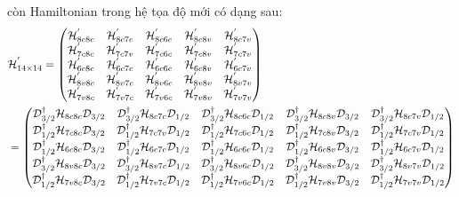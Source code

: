 còn Hamiltonian trong hệ tọa độ mới có dạng sau:
\begin{align}
&\mathcal{H}_{14\times14}^{'}=\begin{pmatrix}
\mathcal{H}_{8c8c}^{'} & \mathcal{H}_{8c7c}^{'} & \mathcal{H}_{8c6c}^{'} & \mathcal{H}_{8c8v}^{'} & \mathcal{H}_{8c7v}^{'}\\
\mathcal{H}_{7c8c}^{'} & \mathcal{H}_{7c7v}^{'} & \mathcal{H}_{7c6c}^{'} & \mathcal{H}_{7c8v}^{'} & \mathcal{H}_{7c7v}^{'}\\
\mathcal{H}_{6c8c}^{'} & \mathcal{H}_{6c7c}^{'} & \mathcal{H}_{6c6c}^{'} & \mathcal{H}_{6c8v}^{'} & \mathcal{H}_{6c7v}^{'}\\
\mathcal{H}_{8v8c}^{'} & \mathcal{H}_{8v7c}^{'} & \mathcal{H}_{8v6c}^{'} & \mathcal{H}_{8v8v}^{'} & \mathcal{H}_{8v7v}^{'}\\
\mathcal{H}_{7v8c}^{'} & \mathcal{H}_{7v7c}^{'} & \mathcal{H}_{7v6c}^{'} & \mathcal{H}_{7v8v}^{'} & \mathcal{H}_{7v7v}^{'}
\end{pmatrix}\notag\\
&=\begin{pmatrix}
\mathcal{D}_{3/2}^{\dagger} \mathcal{H}_{8c8c}\mathcal{D}_{3/2} & \mathcal{D}_{3/2}^{\dagger}\mathcal{H}_{8c7c}\mathcal{D}_{1/2} & \mathcal{D}_{3/2}^{\dagger}\mathcal{H}_{8c6c}\mathcal{D}_{1/2} & \mathcal{D}_{3/2}^{\dagger}\mathcal{H}_{8c8v}\mathcal{D}_{3/2}& \mathcal{D}_{3/2}^{\dagger}\mathcal{H}_{8c7v}\mathcal{D}_{1/2}\\
\mathcal{D}_{1/2}^{\dagger}\mathcal{H}_{7c8c}\mathcal{D}_{3/2} & \mathcal{D}_{1/2}^{\dagger}\mathcal{H}_{7c7v}\mathcal{D}_{1/2} & \mathcal{D}_{1/2}^{\dagger}\mathcal{H}_{7c6c}\mathcal{D}_{1/2} & \mathcal{D}_{1/2}^{\dagger}\mathcal{H}_{7c8v}\mathcal{D}_{3/2} &
\mathcal{D}_{1/2}^{\dagger} \mathcal{H}_{7c7v}\mathcal{D}_{1/2}\\
\mathcal{D}_{1/2}^{\dagger}\mathcal{H}_{6c8c}\mathcal{D}_{3/2} & \mathcal{D}_{1/2}^{\dagger}\mathcal{H}_{6c7c}\mathcal{D}_{1/2} &
\mathcal{D}_{1/2}^{\dagger} \mathcal{H}_{6c6c}\mathcal{D}_{1/2} & \mathcal{D}_{1/2}^{\dagger}\mathcal{H}_{6c8v}\mathcal{D}_{3/2} & \mathcal{D}_{1/2}^{\dagger}\mathcal{H}_{6c7v}\mathcal{D}_{1/2}\\
\mathcal{D}_{3/2}^{\dagger}\mathcal{H}_{8v8c}\mathcal{D}_{3/2} & \mathcal{D}_{3/2}^{\dagger}\mathcal{H}_{8v7c}\mathcal{D}_{1/2} & \mathcal{D}_{3/2}^{\dagger}\mathcal{H}_{8v6c}\mathcal{D}_{1/2} & \mathcal{D}_{3/2}^{\dagger}\mathcal{H}_{8v8v}\mathcal{D}_{3/2} &
\mathcal{D}_{3/2}^{\dagger} \mathcal{H}_{8v7v}\mathcal{D}_{1/2}\\
\mathcal{D}_{1/2}^{\dagger}\mathcal{H}_{7v8c}\mathcal{D}_{3/2} & \mathcal{D}_{1/2}^{\dagger}\mathcal{H}_{7v7c}\mathcal{D}_{1/2} & \mathcal{D}_{1/2}^{\dagger}\mathcal{H}_{7v6c}\mathcal{D}_{1/2} & \mathcal{D}_{1/2}^{\dagger}\mathcal{H}_{7v8v}\mathcal{D}_{3/2} & \mathcal{D}_{1/2}^{\dagger}\mathcal{H}_{7v7v}\mathcal{D}_{1/2}
\end{pmatrix}
\end{align}
